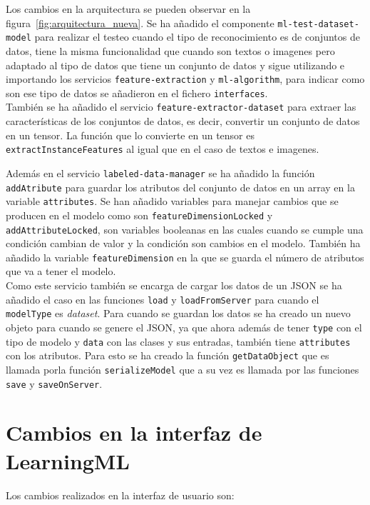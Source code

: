 \documentclass[a4paper, 12pt]{book}
\begin{document}
Los cambios en la arquitectura se pueden observar en la figura~\ref{fig:arquitectura_nueva}. Se ha añadido el componente \texttt{ml-test-dataset-model} para realizar el testeo cuando el tipo de reconocimiento es de conjuntos de datos, tiene la misma funcionalidad que cuando son textos o imagenes pero adaptado al tipo de datos que tiene un conjunto de datos y sigue utilizando e importando los servicios \texttt{feature-extraction} y \texttt{ml-algorithm}, para indicar como son ese tipo de datos se añadieron en el fichero \texttt{interfaces}. \\
También se ha añadido el servicio \texttt{feature-extractor-dataset} para extraer las características de los conjuntos de datos, es decir, convertir un conjunto de datos en un tensor. La función que lo convierte en un tensor es \texttt{extractInstanceFeatures} al igual que en el caso de textos e imagenes.

Además en el servicio \texttt{labeled-data-manager} se ha añadido la función \texttt{addAtribute} para guardar los atributos del conjunto de datos en un array en la variable \texttt{attributes}. Se han añadido variables para manejar cambios que se producen en el modelo como son \texttt{featureDimensionLocked} y \texttt{addAttributeLocked}, son variables booleanas en las cuales cuando se cumple una condición cambian de valor y la condición son cambios en el modelo. También ha añadido la variable \texttt{featureDimension} en la que se guarda el número de atributos que va a tener el modelo. \\
Como este servicio también se encarga de cargar los datos de un JSON se ha añadido el caso en las funciones \texttt{load} y \texttt{loadFromServer} para cuando el \texttt{modelType} es \emph{dataset}. Para cuando se guardan los datos se ha creado un nuevo objeto para cuando se genere el JSON, ya que ahora además de tener \texttt{type} con el tipo de modelo y \texttt{data} con las clases y sus entradas, también tiene \texttt{attributes} con los atributos. Para esto se ha creado la función \texttt{getDataObject} que es llamada porla función \texttt{serializeModel} que a su vez es llamada por las funciones \texttt{save} y \texttt{saveOnServer}.


\section{Cambios en la interfaz de LearningML} 
\label{sec:interfaz}

Los cambios realizados en la interfaz de usuario son:
\end{document}
